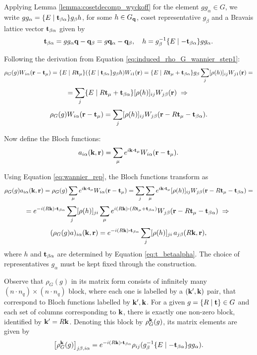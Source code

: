 Applying Lemma \ref{lemma:cosetdecomp_wyckoff} for the element $g g_\alpha \in G$, we write $g g_\alpha = \{ E \mid {\vb{t}}_{\beta\alpha} \} g_\beta h$, for some $h \in G_{\vb{q}}$, coset representative $g_\beta$ and a Bravais lattice vector ${\vb{t}}_{\beta\alpha}$ given by
\begin{equation} \label{eq:t_betaalpha}
{\vb{t}}_{\beta\alpha} = gg_\alpha {\vb{q}} - {\vb{q}}_\beta = g {\vb{q}}_\alpha - {\vb{q}}_\beta, \quad
h = g_\beta^{-1} \{E\mid -{\vb{t}}_{\beta\alpha}\} g g_\alpha.
\end{equation}

Following the derivation from Equation \ref{eq:induced_rho_G_wannier_step1}:
$$
\rho_G(g) W_{i\alpha}({\vb{r}}-{\vb{t}}_\mu) =
\{ E \mid R{\vb{t}}_\mu \} \qty(\{ E \mid {\vb{t}}_{\beta\alpha} \} g_\beta h) W_{i1}({\vb{r}}) =
\{ E \mid R{\vb{t}}_\mu + {\vb{t}}_{\beta\alpha} \} g_\beta \sum_{j} [\rho(h)]_{ij} W_{j1}({\vb{r}}) =
$$
$$
= \sum_{j} \{ E \mid R{\vb{t}}_\mu + {\vb{t}}_{\beta\alpha} \} [\rho(h)]_{ij} W_{j\beta}({\vb{r}}) \; \Rightarrow \;
$$
\begin{equation} \label{eq:wannier_rep}
\rho_G(g) W_{i\alpha}({\vb{r}}-{\vb{t}}_\mu) = \sum_{j} [\rho(h)]_{ij} W_{j\beta}({\vb{r}} - R{\vb{t}}_\mu - {\vb{t}}_{\beta\alpha}).
\end{equation}

\n

Now define the Bloch functions:
\begin{equation} \label{eq:bloch_functions}
a_{i\alpha}(\k, \r) = \sum_{\mu} e^{i\k\vdot\t_\mu} W_{i\alpha}(\r-\t_\mu).
\end{equation}

Using Equation \ref{eq:wannier_rep}, the Bloch functions transform as
$$
\rho_G(g) a_{i\alpha}(\k,\r) =
\rho_G(g) \sum_{\mu} e^{i\k\vdot\t_\mu} W_{i\alpha}(\r-\t_\mu) =
\sum_{j} \sum_{\mu} e^{i\k\vdot\t_\mu} [\rho(h)]_{ij} W_{j\beta}(\r-R\t_\mu-\t_{\beta\alpha}) =
$$
$$
= e^{-i(R\k)\vdot\t_{\beta\alpha}} \sum_{j} [\rho(h)]_{ji} \sum_{\mu} e^{i(R\k)\vdot(R\t_\mu+\t_{\beta\alpha})} W_{j\beta}(\r-R\t_\mu-\t_{\beta\alpha}) \implies
$$
\begin{equation} \label{eq:bloch_rep}
(\rho_G(g) a)_{i\alpha}(\k,\r) = e^{-i(R\k)\vdot\t_{\beta\alpha}} \sum_{j} [\rho(h)]_{ji} \, a_{j\beta}(R\k, \r),
\end{equation}
where $h$ and ${\vb{t}}_{\beta\alpha}$ are determined by Equation \ref{eq:t_betaalpha}. The choice of representatives $g_\alpha$ must be kept fixed through the construction.

Observe that $\rho_G(g)$ in its matrix form consists of infinitely many $(n\cdot n_q)\times (n\cdot n_q)$ block, where each one is labelled by a $({\vb{k}}', {\vb{k}})$ pair, that correspond to Bloch functions labelled by ${\vb{k}}', {\vb{k}}$. For a given $g = \{ R \mid {\vb{t}} \} \in G$ and each set of columns corresponding to ${\vb{k}}$, there is exactly one non-zero block, identified by ${\vb{k}}' = R{\vb{k}}$. Denoting this block by $\rho_G^{\vb{k}}(g)$, its matrix elements are given by
$$
\qty[\rho_G^\k(g)]_{j\beta,i\alpha} = e^{-i(R\k)\vdot\t_{\beta\alpha}}\rho_{ij}(g_\beta^{-1}\sg{E}{-\t_{\beta\alpha}}gg_\alpha).
$$

